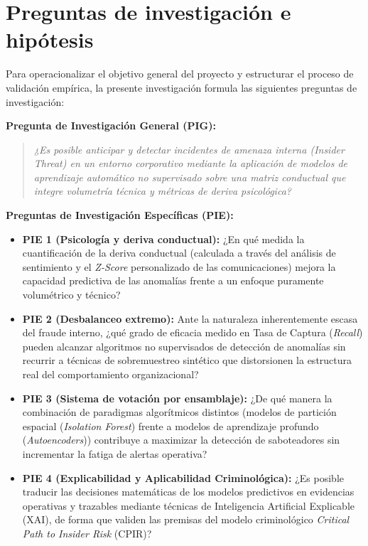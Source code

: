 \documentclass[IB]{TFUOC}%
\begin{document}
\section{Preguntas de investigación e hipótesis}

Para operacionalizar el objetivo general del proyecto y estructurar el proceso de validación empírica, la presente investigación formula las siguientes preguntas de investigación:

\medskip
\noindent\textbf{Pregunta de Investigación General (PIG):}

\begin{quote}
\textit{¿Es posible anticipar y detectar incidentes de amenaza interna (\textit{Insider Threat}) en un entorno corporativo mediante la aplicación de modelos de aprendizaje automático no supervisado sobre una matriz conductual que integre volumetría técnica y métricas de deriva psicológica?}
\end{quote}

\noindent\textbf{Preguntas de Investigación Específicas (PIE):}

\begin{itemize}
    \item \textbf{PIE 1 (Psicología y deriva conductual):} ¿En qué medida la cuantificación de la deriva conductual (calculada a través del análisis de sentimiento y el \textit{Z-Score} personalizado de las comunicaciones) mejora la capacidad predictiva de las anomalías frente a un enfoque puramente volumétrico y técnico?

    \item \textbf{PIE 2 (Desbalanceo extremo):} Ante la naturaleza inherentemente escasa del fraude interno, ¿qué grado de eficacia medido en Tasa de Captura (\textit{Recall}) pueden alcanzar algoritmos no supervisados de detección de anomalías sin recurrir a técnicas de sobremuestreo sintético que distorsionen la estructura real del comportamiento organizacional?

    \item \textbf{PIE 3 (Sistema de votación por ensamblaje):} ¿De qué manera la combinación de paradigmas algorítmicos distintos (modelos de partición espacial (\textit{Isolation Forest}) frente a modelos de aprendizaje profundo (\textit{Autoencoders})) contribuye a maximizar la detección de saboteadores sin incrementar la fatiga de alertas operativa?

    \item \textbf{PIE 4 (Explicabilidad y Aplicabilidad Criminológica):} ¿Es posible traducir las decisiones matemáticas de los modelos predictivos en evidencias operativas y trazables mediante técnicas de Inteligencia Artificial Explicable (XAI), de forma que validen las premisas del modelo criminológico \textit{Critical Path to Insider Risk} (CPIR)?
\end{itemize}
\end{document}
